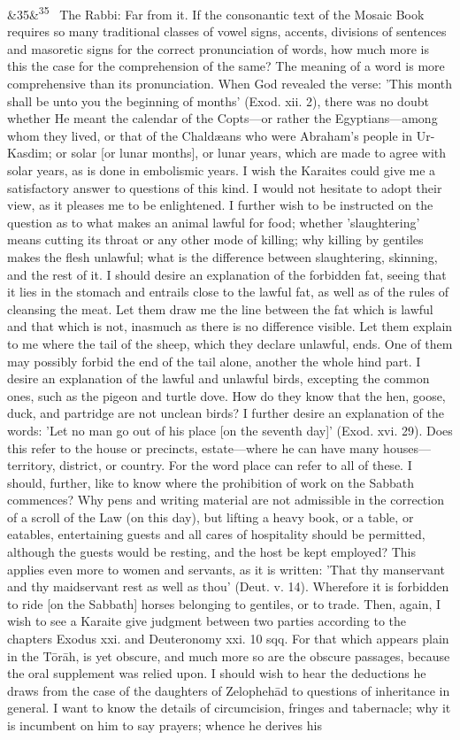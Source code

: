 \documentclass[12pt]{article}
\newcommand{\para}[1][]{\par\noindent\ifx&#1&\else\textsuperscript{\footnotesize #1}~\fi}
\begin{document}
\para[35] The Rabbi: Far from it. If the consonantic text of the Mosaic Book requires so many traditional classes of vowel signs, accents, divisions of sentences and masoretic signs for the correct pronunciation of words, how much more is this the case for the comprehension of the same? The meaning of a word is more comprehensive than its pronunciation. When God revealed the verse: 'This month shall be unto you the beginning of months' (Exod. xii. 2), there was no doubt whether He meant the calendar of the Copts---or rather the Egyptians---among whom they lived, or that of the Chaldæans who were Abraham's people in Ur-Kasdim; or solar [or lunar months], or lunar years, which are made to agree with solar years, as is done in embolismic years. I wish the Karaites could give me a satisfactory answer to questions of this kind. I would not hesitate to adopt their view, as it pleases me to be enlightened. I further wish to be instructed on the question as to what makes an animal lawful for food; whether 'slaughtering' means cutting its throat or any other mode of killing; why killing by gentiles makes the flesh unlawful; what is the difference between slaughtering, skinning, and the rest of it. I should desire an explanation of the forbidden fat, seeing that it lies in the stomach and entrails close to the lawful fat, as well as of the rules of cleansing the meat. Let them draw me the line between the fat which is lawful and that which is not, inasmuch as there is no difference visible. Let them explain to me where the tail of the sheep, which they declare unlawful, ends. One of them may possibly forbid the end of the tail alone, another the whole hind part. I desire an explanation of the lawful and unlawful birds, excepting the common ones, such as the pigeon and turtle dove. How do they know that the hen, goose, duck, and partridge are not unclean birds? I further desire an explanation of the words: 'Let no man go out of his place [on the seventh day]' (Exod. xvi. 29). Does this refer to the house or precincts, estate---where he can have many houses---territory, district, or country. For the word place can refer to all of these. I should, further, like to know where the prohibition of work on the Sabbath commences? Why pens and writing material are not admissible in the correction of a scroll of the Law (on this day), but lifting a heavy book, or a table, or eatables, entertaining guests and all cares of hospitality should be permitted, although the guests would be resting, and the host be kept employed? This applies even more to women and servants, as it is written: 'That thy manservant and thy maidservant rest as well as thou' (Deut. v. 14). Wherefore it is forbidden to ride [on the Sabbath] horses belonging to gentiles, or to trade. Then, again, I wish to see a Karaite give judgment between two parties according to the chapters Exodus xxi. and Deuteronomy xxi. 10 sqq. For that which appears plain in the Tōrāh, is yet obscure, and much more so are the obscure passages, because the oral supplement was relied upon. I should wish to hear the deductions he draws from the case of the daughters of Zelophehād to questions of inheritance in general. I want to know the details of circumcision, fringes and tabernacle; why it is incumbent on him to say prayers; whence he derives his 
\end{document}
